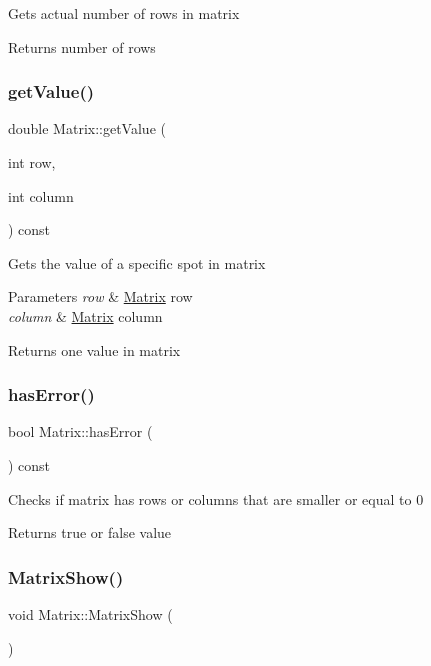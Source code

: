 Gets actual number of rows in matrix \begin{DoxyReturn}{Returns}
number of rows 
\end{DoxyReturn}
\mbox{\label{classMatrix_ab752671c6461d950962e151a1af251ce}} 
\subsubsection{\texorpdfstring{get\+Value()}{getValue()}}
{\footnotesize\ttfamily double Matrix\+::get\+Value (\begin{DoxyParamCaption}\item[{int}]{row,  }\item[{int}]{column }\end{DoxyParamCaption}) const}

Gets the value of a specific spot in matrix 
\begin{DoxyParams}{Parameters}
{\em row} & \hyperlink{classMatrix}{Matrix} row \\
\hline
{\em column} & \hyperlink{classMatrix}{Matrix} column \\
\hline
\end{DoxyParams}
\begin{DoxyReturn}{Returns}
one value in matrix 
\end{DoxyReturn}
\mbox{\label{classMatrix_abf6343d2b9345e08ef800fbc8f19e34e}} 
\subsubsection{\texorpdfstring{has\+Error()}{hasError()}}
{\footnotesize\ttfamily bool Matrix\+::has\+Error (\begin{DoxyParamCaption}{ }\end{DoxyParamCaption}) const}

Checks if matrix has rows or columns that are smaller or equal to 0 \begin{DoxyReturn}{Returns}
true or false value 
\end{DoxyReturn}
\mbox{\label{classMatrix_a3c6fbdb8a8073ec2b2000614777ae930}} 
\subsubsection{\texorpdfstring{Matrix\+Show()}{MatrixShow()}}
{\footnotesize\ttfamily void Matrix\+::\+Matrix\+Show (\begin{DoxyParamCaption}{ }\end{DoxyParamCaption})\hspace{0.3cm}{\ttfamily [inline]}}

